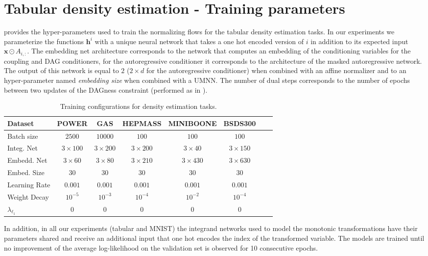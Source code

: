 \section{Tabular density estimation - Training parameters}\label{app:archi-tabular}
 provides the hyper-parameters used to train the normalizing flows for the tabular density estimation tasks. In our experiments we parameterize the functions $\mathbf{h}^i$ with a unique neural network that takes a one hot encoded version of $i$ in addition to its expected input $\mathbf{x} \odot A_{i,:}$. The embedding net architecture corresponds to the network that computes an embedding of the conditioning variables for the coupling and DAG conditioners, for the autoregressive conditioner it corresponds to the architecture of the masked autoregressive network. The output of this network is equal to $2$ ($2 \times d$ for the autoregressive conditioner) when combined with an affine normalizer and to an hyper-parameter named \textit{embedding size} when combined with a UMNN. The number of dual steps corresponds to the number of epochs between two updates of the DAGness constraint (performed as in \cite{DAG-2}).
\begin{table}[H]
    \centering
    \tiny
    \setlength{\tabcolsep}{1pt}
    \renewcommand{\arraystretch}{1.5}
    
    \begin{tabular}{l c c c c c c c}
        \hline
        \hline
        Dataset & \textbf{POWER} & \textbf{GAS} & \textbf{HEPMASS} & \textbf{MINIBOONE} & \textbf{BSDS300}\\
        \hline
        Batch size & $2500$ & $10000$ & $100$ & $100$ & $100$ \\
        Integ. Net & $3 \times 100$ & $3 \times 200$ & $3 \times 200$ & $3 \times 40$ & $3 \times 150$ \\
        Embedd. Net & $3 \times 60$ & $3 \times 80$ & $3 \times 210$ & $3 \times 430$ & $3 \times 630$\\
        Embed. Size & $30$ & $30$ & $30$ & $30$ & $30$\\
        Learning Rate & $0.001$& $0.001$& $0.001$& $0.001$& $0.001$\\
        Weight Decay & $10^{-5}$ &  $10^{-3}$ & $10^{-4}$ & $10^{-2}$ & $10^{-4}$\\
        $\lambda_{\ell_1}$ & $0$ & $0$ & $0$ & $0$ & $0$\\
        \hline\hline
    \end{tabular}
    \vspace{1em}
    \caption{Training configurations for density estimation tasks.}
    \label{tab:train_configs}
\end{table}
In addition, in all our experiments (tabular and MNIST) the integrand networks used to model the monotonic transformations have their parameters shared and receive an additional input that one hot encodes the index of the transformed variable. The models are trained until no improvement of the average log-likelihood on the validation set is observed for 10 consecutive epochs.

